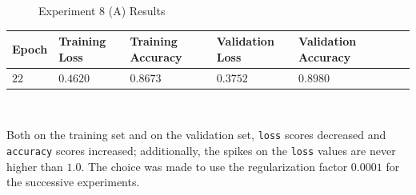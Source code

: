\documentclass[11pt,a4paper]{article}
\begin{document}
\begin{figure}[H]
    \caption{Experiment 8 (A) Results}
\end{figure}
\begin{center}
\hspace*{-0.8cm}
\begin{tabular}{|p{1.2cm}|p{1.8cm}|p{2cm}|p{2cm}|p{2cm}|p{2cm}|p{2cm}|}
\rowcolor{gray!50}
\hline
\textbf{Epoch} & \textbf{Training Loss} & \textbf{Training Accuracy} & \textbf{Validation Loss} & \textbf{Validation Accuracy}\\
\hline
$22$ & $0.4620$ & $0.8673$ & $0.3752$ & $0.8980$\\
\hline
\end{tabular}\\
\end{center}
Both on the training set and on the validation set, \texttt{loss} scores decreased and \texttt{accuracy} scores increased; additionally, the spikes on the \texttt{loss} values are never higher than $1.0$. The choice was made to use the regularization factor $0.0001$ for the successive experiments.
\end{document}
